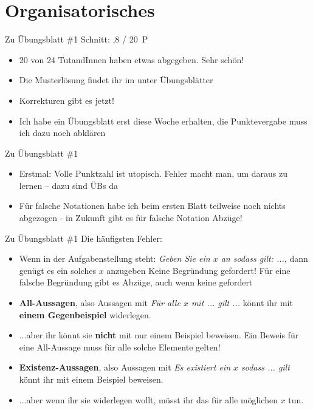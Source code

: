 
\newcommand{\handout}{}



\morescalingdelimiters



\section{Organisatorisches}

\begin{frame}{Zu Übungsblatt \#1}
	Schnitt: ,8 / 20~P

	\begin{itemize}[<+->]
		\item 20 von 24 TutandInnen haben etwas abgegeben. Sehr schön!
		\item Die Musterlösung findet ihr im \ILIAS unter Übungsblätter
		\item Korrekturen gibt es jetzt!
		\item Ich habe ein Übungsblatt erst diese Woche erhalten, die Punktevergabe muss ich dazu noch abklären
	\end{itemize}
\end{frame}

\begin{frame}{Zu Übungsblatt \#1}	
	\begin{itemize}[<+->]
		\item Erstmal: Volle Punktzahl ist utopisch. Fehler macht man, um daraus zu lernen – dazu sind ÜBs da
		\item Für falsche Notationen habe ich beim ersten Blatt teilweise noch nichts abgezogen - in Zukunft gibt es für falsche Notation Abzüge!
	\end{itemize}
\end{frame}

\begin{frame}{Zu Übungsblatt \#1}
	Die häufigsten Fehler:
	\begin{itemize}[<+->]
		\item Wenn in der Aufgabenstellung steht: \textit{Geben Sie ein $x$ an sodass gilt: ...}, dann genügt es ein solches $x$ anzugeben
		\implitem Keine Begründung gefordert!
		\implitem Für eine falsche Begründung gibt es Abzüge, auch wenn keine gefordert
		\item \textbf{All-Aussagen}, also Aussagen mit \textit{Für alle $x$ mit ... gilt ...} könnt ihr mit \textbf{einem Gegenbeispiel} widerlegen.
		\item ...aber ihr könnt sie \textbf{nicht} mit nur einem Beispiel beweisen. Ein Beweis für eine All-Aussage muss für alle solche Elemente gelten!
		\item \textbf{Existenz-Aussagen}, also Aussagen mit \textit{Es existiert ein $x$ sodass ... gilt} könnt ihr mit einem Beispiel beweisen.
		\item ...aber wenn ihr sie widerlegen wollt, müsst ihr das für alle möglichen $x$ tun.
	\end{itemize}
\end{frame}

